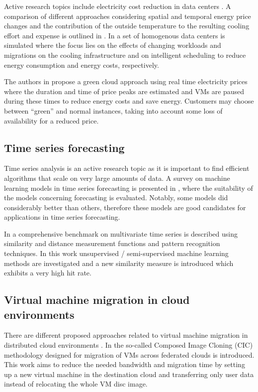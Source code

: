 Active research topics include electricity cost reduction in data centers \cite{guler2013cutting, le2011reducing}. A comparison of different approaches considering spatial and temporal energy price changes and the contribution of the outside temperature to the resulting cooling effort and expense is outlined in \cite{guler2013cutting}. In \cite{le2011reducing} a set of homogenous data centers is simulated where the focus lies on the effects of changing workloads and migrations on the cooling infrastructure and on intelligent scheduling to reduce energy consumption and energy costs, respectively. 

The authors in \cite{lucanin2013take} propose a green cloud approach using real time electricity prices where the duration and time of price peaks are estimated and VMs are paused during these times to reduce energy costs and save energy. Customers may choose between ``green'' and normal instances, taking into account some loss of availability for a reduced price. 

\subsection{Time series forecasting}

Time series analysis is an active research topic as it is important to find efficient algorithms that scale on very large amounts of data. A survey on machine learning models in time series forecasting is presented in \cite{ahmed2010empirical}, where the suitability of the models concerning forecasting is evaluated. Notably, some models did considerably better than others, therefore these models are good candidates for applications in time series forecasting. 

In \cite{lin2012pattern} a comprehensive benchmark on multivariate time series is described using similarity and distance measurement functions and pattern recognition techniques. In this work unsupervised / semi-supervised machine learning methods are investigated and a new similarity measure is introduced which exhibits a very high hit rate. 

\subsection{Virtual machine migration in cloud environments}

There are different proposed approaches related to virtual machine migration in distributed cloud environments \cite{celesti2010improving, malet2010resource}. In \cite{celesti2010improving} the so-called Composed Image Cloning (CIC) methodology designed for migration of VMs across federated clouds is introduced. This work aims to reduce the needed bandwidth and migration time by setting up a new virtual machine in the destination cloud and transferring only user data instead of relocating the whole VM disc image. 

